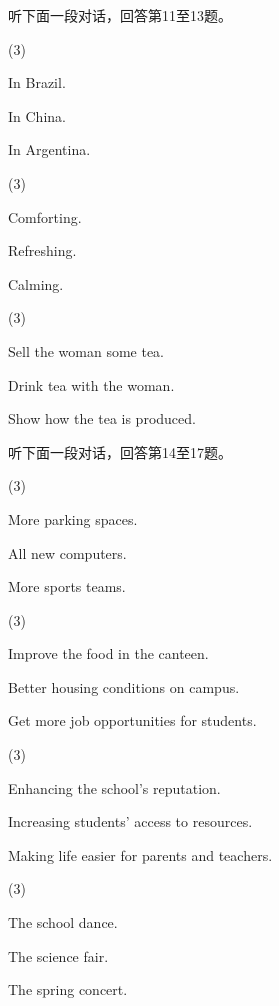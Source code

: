 \documentclass{英语试卷}
\begin{document}
\par 听下面一段对话，回答第11至13题。\par
{}
\begin{choices}(3)
  \item In Brazil.
  \item In China.
  \item In Argentina.
\end{choices}
\begin{choices}(3)
  \item Comforting.
  \item Refreshing.
  \item Calming.
\end{choices}
\begin{choices}(3)
  \item Sell the woman some tea.
  \item Drink tea with the woman.
  \item Show how the tea is produced.
\end{choices}
\par 听下面一段对话，回答第14至17题。\par
{}
\begin{choices}(3)
  \item More parking spaces.
  \item All new computers.
  \item More sports teams.
\end{choices}
\begin{choices}(3)
  \item Improve the food in the canteen.
  \item Better housing conditions on campus.
  \item Get more job opportunities for students.
\end{choices}
\begin{choices}(3)
  \item Enhancing the school's reputation.
  \item Increasing students' access to resources.
  \item Making life easier for parents and teachers.
\end{choices}
\begin{choices}(3)
  \item The school dance.
  \item The science fair.
  \item The spring concert.
\end{choices}
\end{document}
